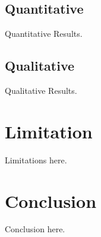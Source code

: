 \documentclass[runningheads]{llncs}
\begin{document}
\subsection{Quantitative}

Quantitative Results.

\subsection{Qualitative}

Qualitative Results.

\section{Limitation}

Limitations here.

\section{Conclusion}

Conclusion here.


%
%
%

% 
%

\end{document}
